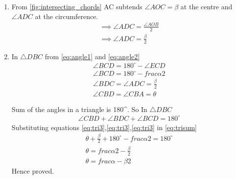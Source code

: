 \begin{enumerate}[label=\thesection.\arabic*.,ref=\thesection.\theenumi]
\item From \ref{fig:intersecting_chords} AC subtends $\angle AOC = \beta$ at the centre and $\angle ADC$ at the circumference.
\begin{align}
\implies \angle ADC = \frac{\angle AOB}{2}
\\
\implies \angle ADC = \frac{\beta}{2}
\label{eq:angle2}
\end{align}


\item In $\triangle DBC$ from \ref{eq:angle1} and \ref{eq:angle2}
\begin{align}
\angle BCD = 180^{\circ} - \angle ECD
\\
\angle BCD = 180^{\circ} - frac{\alpha}{2}
\label{eq:tri1}
\\
\angle BDC = \angle ADC = \frac{\beta}{2}
\label{eq:tri2}
\\
\angle CBD = \angle CBA = \theta
\label{eq:tri3}
\end{align}

Sum of the angles in a triangle is 180^{\circ}. So In $\triangle DBC$
\begin{align}
\angle CBD + \angle BDC + \angle BCD = 180^{\circ}
\label{eq:trisum}
\end{align}
Substituting equations \ref{eq:tri3},\ref{eq:tri3},\ref{eq:tri3} in \ref{eq:trisum}
\begin{align}
\theta + \frac{\beta}{2} + 180^{\circ} - frac{\alpha}{2} = 180^{\circ}
\\
\theta = frac{\alpha}{2} - \frac{\beta}{2}
\\
\theta = frac{\alpha - \beta}{2} 
\end{align}
Hence proved.
\end{enumerate}
